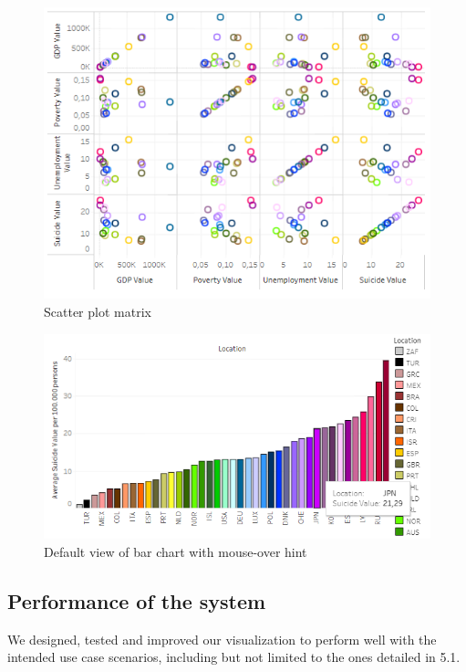 \documentclass{vgtc}                          %
\begin{document}
\begin{itemize}
\begin{figure}[tb]
\centering
\includegraphics[width=\columnwidth]{image/chris/researcher05.png}
\caption{Scatter plot matrix}
\label{fig:resScatter} 
\end{figure}

\begin{figure}[tb]
\centering
\includegraphics[width=\columnwidth]{image/chris/researcher06.png}
\caption{Default view of bar chart with mouse-over hint}
\label{fig:resBarChart} 
\end{figure}

\end{itemize}

\subsection{Performance of the system}
We designed, tested and improved our visualization to perform well with the intended use case scenarios, including but not limited to the ones detailed in 5.1.
\end{document}
